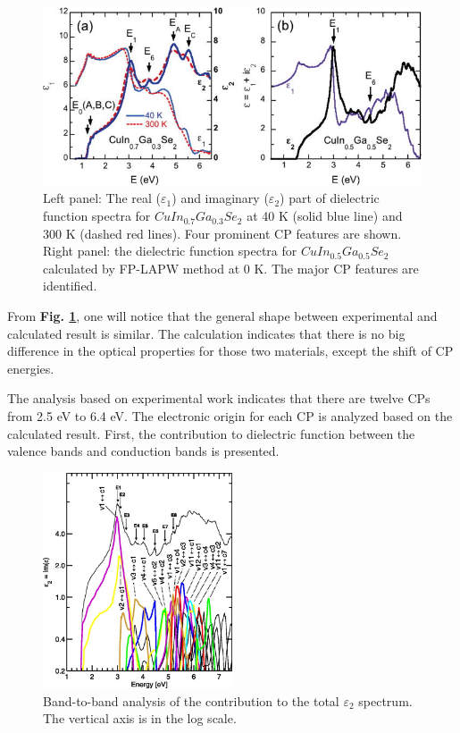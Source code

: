 \documentclass[a4paper, 12pt, titlepage,oneside,drop]{kthesis}
\begin{document}
 \begin{figure}[H]
    \begin{center}
            \includegraphics[width=1\textwidth]{111111.png}
     \end{center}
    \caption{Left panel: The real ($\varepsilon_1$) and imaginary ($\varepsilon_2$) part of dielectric function spectra for $CuIn_{0.7}Ga_{0.3}Se_2$ 
at 40 K (solid blue line) and 300 K (dashed red lines). Four prominent CP features are shown. Right panel: the dielectric function spectra for  $CuIn_{0.5}Ga_{0.5}Se_2$
calculated by FP-LAPW method at 0 K. The major CP features are identified. }
   \label{df1}
\end{figure}

From \textbf{Fig. \ref{df1}}, one will notice that the general shape between experimental and calculated result is similar. The calculation indicates that there is no big 
difference in the optical properties for those two materials, except the shift of CP energies.
 
The analysis based on experimental work indicates that there are twelve CPs from 2.5 eV to 6.4 eV. The electronic origin for each CP is analyzed based on the calculated 
result. First, the contribution to dielectric function between the valence bands and conduction bands is presented.

 \begin{figure}[H]
    \begin{center}
            \includegraphics[width=0.5\textwidth]{222222}
     \end{center}
    \caption{Band-to-band analysis of the contribution to the total $\varepsilon_2$ spectrum. The vertical axis is in the log scale.}
   \label{df2}
\end{figure}
\end{document}
